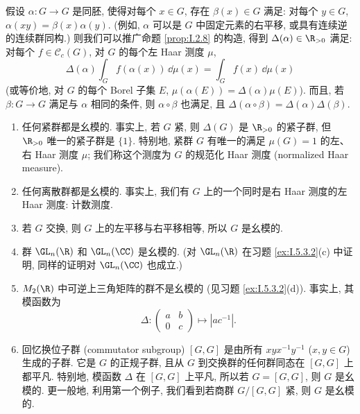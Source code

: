 \begin{remark}[推广的模因子]
\label{rem:I.2.10}
假设 $\alpha \colon G \to G$ 是同胚, 使得对每个 $x \in G$, 存在 $\beta(x) \in G$ 满足: 对每个 $y \in G$, $\alpha(xy) = \beta(x)\alpha(y)$. (例如, $\alpha$ 可以是 $G$ 中固定元素的右平移, 或具有连续逆的连续群同构.) 则我们可以推广命题 \ref{prop:I.2.8} 的构造, 得到 $\Delta(\alpha) \in \R_{>0}$ 满足: 对每个 $f \in \mathcal{C}_c(G)$, 对 $G$ 的每个左 Haar 测度 $\mu$,
\[
\Delta(\alpha)\int_G f(\alpha(x)) \,\dd\mu(x) = \int_G f(x) \,\dd\mu(x)
\]
(或等价地, 对 $G$ 的每个 Borel 子集 $E$, $\mu(\alpha(E)) = \Delta(\alpha)\mu(E)$). 而且, 若 $\beta \colon G \to G$ 满足与 $\alpha$ 相同的条件, 则 $\alpha \circ \beta$ 也满足, 且 $\Delta(\alpha \circ \beta) = \Delta(\alpha)\Delta(\beta)$.
\end{remark}

\begin{example}[幺模群的例子]
\label{exa:I.2.11}
\begin{enumerate}
\item[(1)] 任何紧群都是幺模的. 事实上, 若 $G$ 紧, 则 $\Delta(G)$ 是 $\R_{>0}$ 的紧子群, 但 $\R_{>0}$ 唯一的紧子群是 $\{1\}$. 特别地, 紧群 $G$ 有唯一的满足 $\mu(G) = 1$ 的左、右 Haar 测度 $\mu$; 我们称这个测度为 $G$ 的规范化 Haar 测度 (normalized Haar measure).
\item[(2)] 任何离散群都是幺模的. 事实上, 我们有 $G$ 上的一个同时是右 Haar 测度的左 Haar 测度: 计数测度.
\item[(3)] 若 $G$ 交换, 则 $G$ 上的左平移与右平移相等, 所以 $G$ 是幺模的.
\item[(4)] 群 $\GL_n(\R)$ 和 $\GL_n(\CC)$ 是幺模的. (对 $\GL_n(\R)$ 在习题 \ref{ex:I.5.3.2}(c) 中证明, 同样的证明对 $\GL_n(\CC)$ 也成立.)
\item[(5)] $M_2(\R)$ 中可逆上三角矩阵的群不是幺模的 (见习题 \ref{ex:I.5.3.2}(d)). 事实上, 其模函数为
  \[
  \Delta \colon \begin{pmatrix} a & b \\ 0 & c \end{pmatrix} \longmapsto |ac^{-1}|.
  \]
\item[(6)] 回忆换位子群 (commutator subgroup) $[G, G]$ 是由所有 $xyx^{-1}y^{-1}$ ($x, y \in G$) 生成的子群. 它是 $G$ 的正规子群, 且从 $G$ 到交换群的任何群同态在 $[G, G]$ 上都平凡. 特别地, 模函数 $\Delta$ 在 $[G, G]$ 上平凡, 所以若 $G = [G, G]$, 则 $G$ 是幺模的. 更一般地, 利用第一个例子, 我们看到若商群 $G/[G, G]$ 紧, 则 $G$ 是幺模的.
\end{enumerate}
\end{example}

